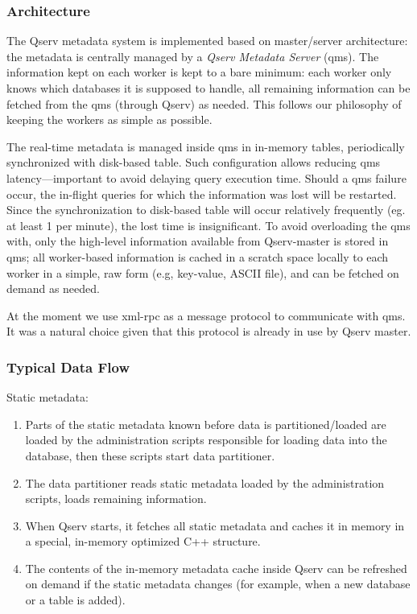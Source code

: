 \documentclass[DM,lsstdraft,toc]{lsstdoc}
\begin{document}
\subsubsection{Architecture}\label{architecture}

The Qserv metadata system is implemented based on master/server
architecture: the metadata is centrally managed by a \emph{Qserv
Metadata Server} (qms). The information kept on each worker is kept to a
bare minimum: each worker only knows which databases it is supposed to
handle, all remaining information can be fetched from the qms (through
Qserv) as needed. This follows our philosophy of keeping the workers as
simple as possible.

The real-time metadata is managed inside qms in in-memory tables,
periodically synchronized with disk-based table. Such configuration
allows reducing qms latency---important to avoid delaying query
execution time. Should a qms failure occur, the in-flight queries for
which the information was lost will be restarted. Since the
synchronization to disk-based table will occur relatively frequently
(eg. at least 1 per minute), the lost time is insignificant. To avoid
overloading the qms with, only the high-level information available from
Qserv-master is stored in qms; all worker-based information is cached in
a scratch space locally to each worker in a simple, raw form (e.g,
key-value, ASCII file), and can be fetched on demand as needed.

At the moment we use xml-rpc as a message protocol to communicate with
qms. It was a natural choice given that this protocol is already in use
by Qserv master.

\subsubsection{Typical Data Flow}\label{typical-data-flow}

Static metadata:

\begin{enumerate}
\def\labelenumi{\arabic{enumi}.}
\item
  Parts of the static metadata known before data is partitioned/loaded
  are loaded by the administration scripts responsible for loading data
  into the database, then these scripts start data partitioner.
\item
  The data partitioner reads static metadata loaded by the
  administration scripts, loads remaining information.
\item
  When Qserv starts, it fetches all static metadata and caches it in
  memory in a special, in-memory optimized C++ structure.
\item
  The contents of the in-memory metadata cache inside Qserv can be
  refreshed on demand if the static metadata changes (for example, when
  a new database or a table is added).
\end{enumerate}
\end{document}
